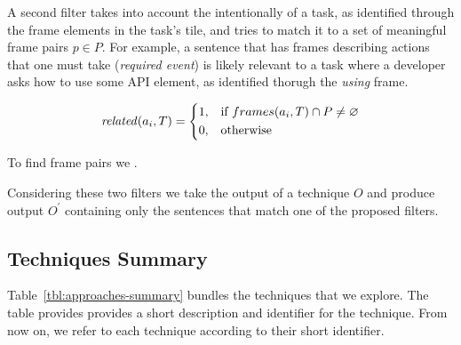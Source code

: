 \smallskip
A second filter takes into account the intentionally of a task, as identified through the frame elements in the task's tile, and tries to match it to a set of meaningful frame pairs $p \in P$. For example, a sentence that has frames describing actions that one must take (\textit{required event})  is likely relevant to a task where a developer asks how to use some API element, as identified thorugh the \textit{using} frame.


\begin{equation}
\text{\textit{related}}(a_i, T) = \left \{
\begin{aligned}
    &1, && \text{if}\ frames(a_i, T) \cap P \ne \emptyset \\
    &0, && \text{otherwise}
\end{aligned} \right.
\end{equation} 


To find frame pairs we .



Considering these two filters we take the output of a technique $O$ and produce output $O^{\prime}$ containing only the sentences that match one of the proposed filters.



\subsection{Techniques Summary}


Table~\ref{tbl:approaches-summary} bundles the techniques that we explore.
The table provides provides a short description and identifier for the technique. From now on, we refer to each technique according to their short identifier.


